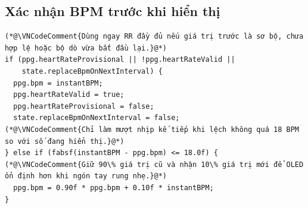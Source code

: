 \documentclass[12pt]{article}
\begin{document}
\subsection{Xác nhận BPM trước khi hiển thị}

\Needspace{0.24\textheight}
\begin{lstlisting}[style=firmware,caption={Khoảng RR hợp lệ đầu tiên tạo BPM ban đầu}]
(*@\VNCodeComment{Dùng ngay RR đầy đủ nếu giá trị trước là sơ bộ, chưa hợp lệ hoặc bộ dò vừa bắt đầu lại.}@*)
if (ppg.heartRateProvisional || !ppg.heartRateValid ||
    state.replaceBpmOnNextInterval) {
  ppg.bpm = instantBPM;
  ppg.heartRateValid = true;
  ppg.heartRateProvisional = false;
  state.replaceBpmOnNextInterval = false;
(*@\VNCodeComment{Chỉ làm mượt nhịp kế tiếp khi lệch không quá 18 BPM so với số đang hiển thị.}@*)
} else if (fabsf(instantBPM - ppg.bpm) <= 18.0f) {
(*@\VNCodeComment{Giữ 90\% giá trị cũ và nhận 10\% giá trị mới để OLED ổn định hơn khi ngón tay rung nhẹ.}@*)
  ppg.bpm = 0.90f * ppg.bpm + 0.10f * instantBPM;
}
\end{lstlisting}

\Needspace{0.42\textheight}
\end{document}
